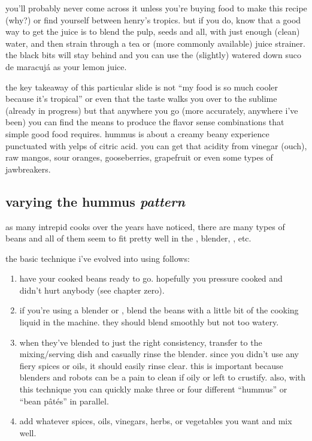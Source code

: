 you'll probably never come across it unless you're buying food
to make this recipe (why?) or find yourself between henry's
tropics. but if you do, know that a good way to get the juice is to
blend the pulp, seeds and all, with just enough (clean) water, and
then strain through a tea or (more commonly available) juice
strainer. the black bits will stay behind and you can use the
(slightly) watered down suco de maracuj\'{a} as your lemon juice.

the key takeaway of this particular slide is not ``my food is so
much cooler because it's tropical'' or even that the taste walks
you over to the sublime (already in progress) but that anywhere you go
(more accurately, anywhere i've been) you can find the means to
produce the flavor sense combinations that simple good food
requires. hummus is about a creamy beany experience punctuated with
yelps of citric acid. you can get that acidity from vinegar (ouch),
raw mangos, sour oranges, gooseberries, grapefruit or even some types
of jawbreakers.

\subsection{varying the hummus \textit{pattern}}

as many intrepid cooks over the years have noticed, there are many
types of beans and all of them seem to fit pretty well in the ,
blender, , etc.

the basic technique i've evolved into using follows:

\begin{enumerate}
  \item have your cooked beans ready to go. hopefully you pressure
  cooked and didn't hurt anybody (see chapter zero).

  \item if you're using a blender or , blend the beans with a
  little bit of the cooking liquid in the machine. they should blend
  smoothly but not too watery.

  \item when they've blended to just the right consistency,
  transfer to the mixing/serving dish and casually rinse the
  blender. since you didn't use any fiery spices or oils, it should
  easily rinse clear. this is important because blenders and robots
  can be a pain to clean if oily or left to crustify. also, with this
  technique you can quickly make three or four different
  ``hummus'' or ``bean p\^{a}t\'{e}s'' in parallel.

  \item add whatever spices, oils, vinegars, herbs, or vegetables you
  want and mix well.
\end{enumerate}

